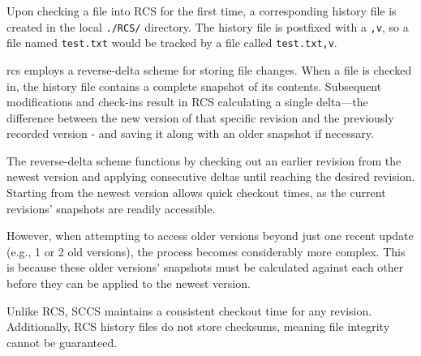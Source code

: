 Upon checking a file into RCS for the first time, a corresponding history file is created in the local \lstinline{./RCS/} directory. The history file is postfixed with a \lstinline{,v}, so a file named \lstinline{test.txt} would be tracked by a file called \lstinline{test.txt,v}\cite{stopak_2019}.
\smallskip

\acrshort{rcs} employs a reverse-delta scheme for storing file changes. When a file is checked in, the history file contains a complete snapshot of its contents. Subsequent modifications and check-ins result in RCS calculating a single delta—the difference between the new version of that specific revision and the previously recorded version - and saving it along with an older snapshot if necessary.
\smallskip

The reverse-delta scheme functions by checking out an earlier revision from the newest version and applying consecutive deltas until reaching the desired revision. Starting from the newest version allows quick checkout times, as the current revisions' snapshots are readily accessible.
\smallskip

However, when attempting to access older versions beyond just one recent update (e.g., 1 or 2 old versions), the process becomes considerably more complex. This is because these older versions' snapshots must be calculated against each other before they can be applied to the newest version.
\smallskip

Unlike RCS, SCCS maintains a consistent checkout time for any revision. Additionally, RCS history files do not store checksums, meaning file integrity cannot be guaranteed.


